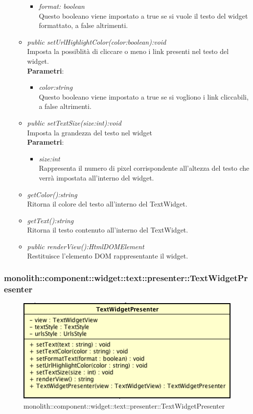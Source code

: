 \begin{itemize}
\begin{itemize}
\begin{itemize}
		\item \textit{format: boolean}\\
		Questo booleano viene impostato a true se si vuole il testo del widget formattato, a false altrimenti.
		\end{itemize} 
	\item \textit{public setUrlHighlightColor(color:boolean):void}\\
	Imposta la possiblità di cliccare o meno i link presenti nel testo del widget.
		\\ \textbf{Parametri}: \begin{itemize}
		\item \textit{color:string}\\
		Questo booleano viene impostato a true se si vogliono i link cliccabili, a false altrimenti.
		\end{itemize} 
	\item \textit{public setTextSize(size:int):void}\\
	Imposta la grandezza del testo nel widget
		\\ \textbf{Parametri}: \begin{itemize}
		\item \textit{size:int}\\
		Rappresenta il numero di pixel corrispondente all'altezza del testo che verrà impostata all'interno del widget.
		\end{itemize} 
	\item \textit{getColor():string}\\
	Ritorna il colore del testo all'interno del TextWidget.
	\item \textit{getText():string}\\
	Ritorna il testo contenuto all'interno del TextWidget.
	\item \textit{public renderView():HtmlDOMElement}\\
	Restituisce l'elemento DOM rappresentante il widget.
	\end{itemize}
\end{itemize}

\subsubsection{monolith::component::widget::text::presenter::TextWidgetPresenter}

\label{monolith::component::widget::text::presenter::TextWidgetPresenter}
\begin{figure}[H]
	\centering
	\includegraphics[scale=0.5]{Sezioni/SottosezioniST/img/TextWidgetPresenter.png}
	\caption{monolith::component::widget::text::presenter::TextWidgetPresenter}
\end{figure}

